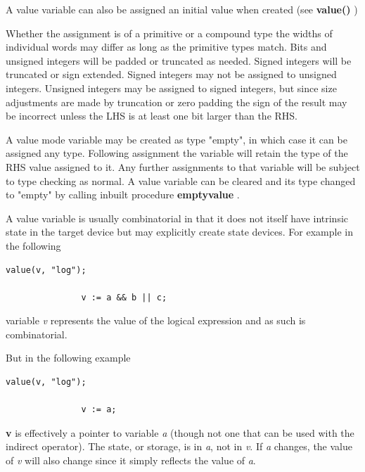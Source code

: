         A value variable can also be assigned an initial value when created
        (see {\bf value()} )
        
        Whether the assignment is of a primitive or a compound type the widths
        of individual words may differ as long as the primitive types match.
        Bits and unsigned integers will be padded or truncated as needed.
        Signed integers will be truncated or sign extended. Signed integers
        may not be assigned to unsigned integers. Unsigned integers may be
        assigned to signed integers, but since size adjustments are made
        by truncation or zero padding the sign of the result may be incorrect
        unless the LHS is at least one bit larger than the RHS.
        
        A value mode variable may be created as type "empty", in which case it
        can be assigned any type. Following assignment the variable will retain
        the type of the RHS value assigned to it. Any further assignments to
        that variable will be subject to type checking as normal. A value
        variable can be cleared and its type changed to "empty" by calling
        inbuilt procedure {\bf emptyvalue} .
        
        A value variable is usually combinatorial in that it does not itself have
        intrinsic state in the target device but may explicitly create state
        devices. For example in the following
        \begin{lstlisting}[gobble=8, language=threepl]
               value(v, "log");
               
               v := a && b || c;
        \end{lstlisting}
        variable {\em v} represents the value of the logical expression and as
        such is combinatorial.
        
        But in the following example
        \begin{lstlisting}[gobble=8, language=threepl]
               value(v, "log");
               
               v := a;
        \end{lstlisting}
        {\bf v} is effectively a pointer to variable {\em a} (though not one that
        can be used with the indirect operator). The state, or storage, is in {\em
        a}, not in {\em v}. If {\em a} changes, the value of {\em v} will also
        change since it simply reflects the value of {\em a}.
        
